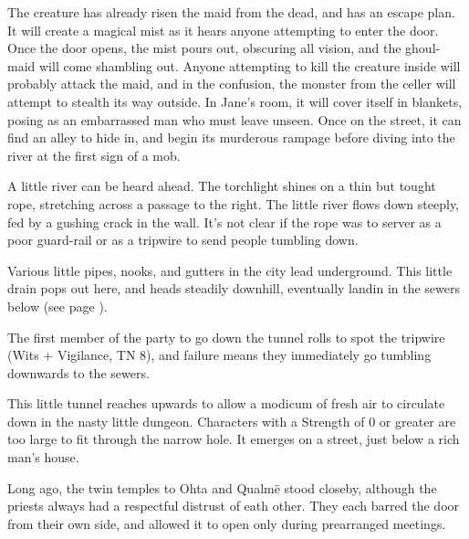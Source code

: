 \begin{multicols}{2}


The creature has already risen the maid from the dead, and has an escape plan.  It will create a magical mist as it hears anyone attempting to enter the door.  Once the door opens, the mist pours out, obscuring all vision, and the ghoul-maid will come shambling out.  Anyone attempting to kill the creature inside will probably attack the maid, and in the confusion, the monster from the celler will attempt to stealth its way outside.  In Jane's room, it will cover itself in blankets, posing as an embarrassed man who must leave unseen.  Once on the street, it can find an alley to hide in, and begin its murderous rampage before diving into the river at the first sign of a mob.


\ghoul


\begin{boxtext}
	A little river can be heard ahead.  The torchlight shines on a thin but tought rope, stretching across a passage to the right.  The little river flows down steeply, fed by a gushing crack in the wall.  It's not clear if the rope was to server as a poor guard-rail or as a tripwire to send people tumbling down.
\end{boxtext}

Various little pipes, nooks, and gutters in the city lead underground.  This little drain pops out here, and heads steadily downhill, eventually landin in the sewers below (see page \pageref{slidein}).

The first member of the party to go down the tunnel rolls to spot the tripwire (Wits + Vigilance, TN 8), and failure means they immediately go tumbling downwards to the sewers.

This little tunnel reaches upwards to allow a modicum of fresh air to circulate down in the nasty little dungeon.  Characters with a Strength of 0 or greater are too large to fit through the narrow hole.  It emerges on a street, just below a rich man's house.

Long ago, the twin temples to Ohta and Qualm\"{e} stood closeby, although the priests always had a respectful distrust of eath other.  They each barred the door from their own side, and allowed it to open only during prearranged meetings.


\end{multicols}
